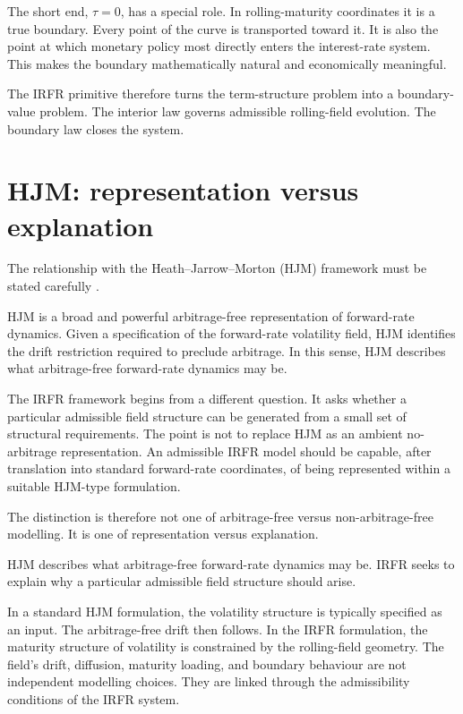 \documentclass[11pt,oneside]{book}
\begin{document}
The short end, $\tau=0$, has a special role. In rolling-maturity coordinates
it is a true boundary. Every point of the curve is transported toward
it. It is also the point at which monetary policy most directly enters
the interest-rate system. This makes the boundary mathematically natural
and economically meaningful.

The IRFR primitive therefore turns the term-structure problem into a
boundary-value problem. The interior law governs admissible
rolling-field evolution. The boundary law closes the system.

\section{HJM: representation versus explanation}\label{hjm-representation-versus-explanation}

The relationship with the Heath--Jarrow--Morton (HJM) framework must be
stated carefully \cite{HeathJarrowMorton1992,MusielaRutkowski2005,Filipovic2001}.

HJM is a broad and powerful arbitrage-free representation of
forward-rate dynamics. Given a specification of the forward-rate
volatility field, HJM identifies the drift restriction required to
preclude arbitrage. In this sense, HJM describes what arbitrage-free
forward-rate dynamics may be.

The IRFR framework begins from a different question. It asks whether a
particular admissible field structure can be generated from a small set
of structural requirements. The point is not to replace HJM as an
ambient no-arbitrage representation. An admissible IRFR model should be
capable, after translation into standard forward-rate coordinates, of
being represented within a suitable HJM-type formulation.

The distinction is therefore not one of arbitrage-free versus
non-arbitrage-free modelling. It is one of representation versus
explanation.

HJM describes what arbitrage-free forward-rate dynamics may be. IRFR
seeks to explain why a particular admissible field structure should
arise.

In a standard HJM formulation, the volatility structure is typically
specified as an input. The arbitrage-free drift then follows. In the
IRFR formulation, the maturity structure of volatility is constrained by
the rolling-field geometry. The field's drift, diffusion, maturity
loading, and boundary behaviour are not independent modelling choices.
They are linked through the admissibility conditions of the IRFR system.
\end{document}
